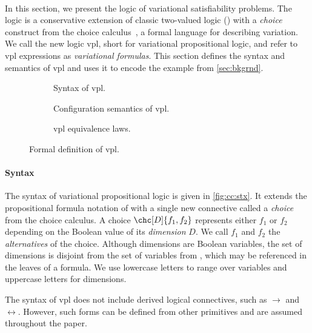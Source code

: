 ~\label{chapter:vpl}

In this section, we present the logic of variational satisfiability problems.
%
The logic is a conservative extension of classic two-valued logic (\pl{})
with a \emph{choice} construct from the choice
calculus~\cite{EW11tosem,Walk13thesis}, a formal language for describing
variation. We call the new logic \acs{vpl}, short for variational propositional
logic, and refer to \ac{vpl} expressions as \emph{variational formulas}.
%
This section defines the syntax and semantics of \ac{vpl} and uses it to encode
the example from \autoref{sec:bkgrnd}.


\begin{figure}
  \begin{subfigure}[t]{\linewidth}
    \centering
    
    \caption{Syntax of \ac{vpl}.}%
    \label{fig:cc:stx}
  \end{subfigure}
%
  \begin{subfigure}[t]{\linewidth}
    
    \centering
    \caption{Configuration semantics of \ac{vpl}.}%
    \label{fig:cc:cfg}
  \end{subfigure}
%
  \begin{subfigure}[t]{\linewidth}
    
    \centering
    \caption{\ac{vpl} equivalence laws.}%
    \label{fig:cc:eqv}
  \end{subfigure}
\caption{Formal definition of \ac{vpl}.}%
\label{fig:cc}
\end{figure}
%

\paragraph{Syntax}
%
The syntax of variational propositional logic is given in
\autoref{fig:cc:stx}. It extends the propositional formula notation of \pl{}
with a single new connective called a \emph{choice} from the choice calculus.
%
A choice $\chc[D]{f_1,f_2}$ represents either $f_1$ or $f_2$ depending on the
Boolean value of its \emph{dimension} $D$. We call $f_1$ and $f_2$ the
\emph{alternatives} of the choice.
%
Although dimensions are Boolean variables, the set of dimensions is disjoint
from the set of variables from \pl{}, which may be referenced in the leaves of
a formula. We use lowercase letters to range over variables and uppercase
letters for dimensions.

The syntax of \ac{vpl} does not include derived logical connectives, such as
$\rightarrow$ and $\leftrightarrow$. However, such forms can be defined
  from other primitives and are assumed throughout the paper.

